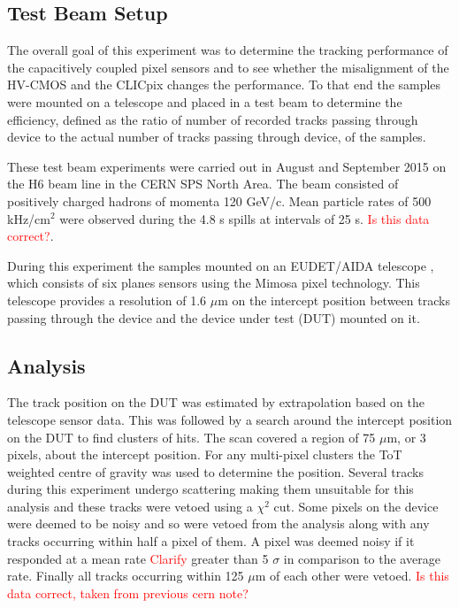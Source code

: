 
\subsection{Test Beam Setup}
The overall goal of this experiment was to determine the tracking performance of the capacitively coupled pixel sensors and to see whether the misalignment of the HV-CMOS and the CLICpix changes the performance.  To that end the samples were mounted on a telescope and placed in a test beam to determine the efficiency, defined as the ratio of number of recorded tracks passing through device to the actual number of tracks passing through device, of the samples.  

These test beam experiments were carried out in August and September 2015 on the H6 beam line in the CERN SPS North Area.  The beam consisted of positively charged hadrons of momenta 120 GeV/c.  Mean particle rates of 500 kHz/cm$^{2}$ were observed during the 4.8 s spills at intervals of 25 s.  \textcolor{red}{Is this data correct?}.

During this experiment the samples mounted on an EUDET/AIDA telescope \cite{Rubinskiy:2000287}, which consists of six planes sensors using the Mimosa pixel technology.  This telescope provides a resolution of 1.6 $\mu$m on the intercept position between tracks passing through the device and the device under test (DUT) mounted on it.  


\subsection{Analysis}
The track position on the DUT was estimated by extrapolation based on the telescope sensor data.  This was followed by a search around the intercept position on the DUT to find clusters of hits.  The scan covered a region of 75 $\mu$m, or 3 pixels, about the intercept position.  For any multi-pixel clusters the ToT weighted centre of gravity was used to determine the position.  Several tracks during this experiment undergo scattering making them unsuitable for this analysis and these tracks were vetoed using a $\chi^{2}$ cut.  Some pixels on the device were deemed to be noisy and so were vetoed from the analysis along with any tracks occurring within half a pixel of them.  A pixel was deemed noisy if it responded at a mean rate \textcolor{red}{Clarify} greater than 5 $\sigma$ in comparison to the average rate.  Finally all tracks occurring within 125 $\mu$m of each other were vetoed.  \textcolor{red}{Is this data correct, taken from previous cern note?}

